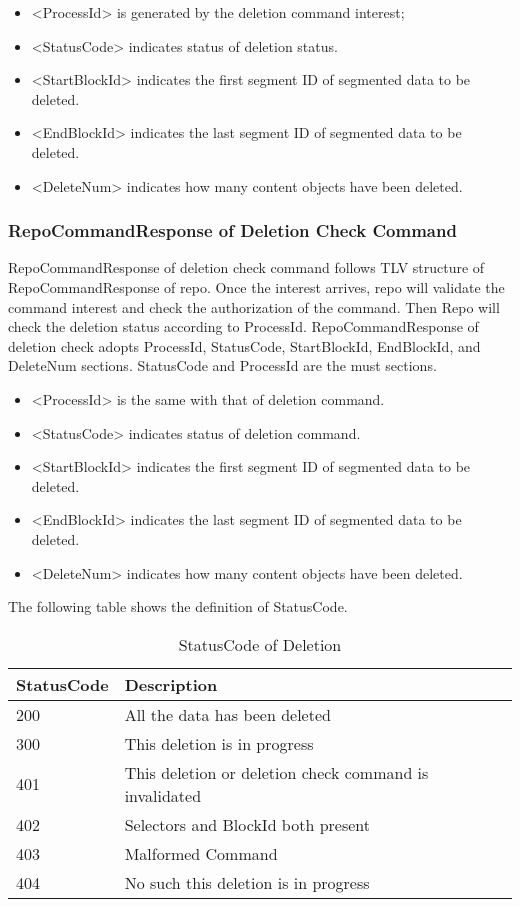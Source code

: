 \documentclass{acm_proc_article-sp}
\begin{document}
\begin{itemize}
\item <ProcessId> is generated by the deletion command interest;
\item <StatusCode> indicates status of deletion status.
\item <StartBlockId> indicates the first segment ID of segmented data to be deleted.
\item <EndBlockId> indicates the last segment ID of segmented data to be deleted.
\item <DeleteNum> indicates how many content objects have been deleted.
\end{itemize}

\subsubsection{RepoCommandResponse of Deletion Check Command}
RepoCommandResponse of deletion check command follows TLV structure of RepoCommandResponse of repo. Once the interest arrives, repo will validate the command interest and check the authorization of the command. Then Repo will check the deletion status according to ProcessId. RepoCommandResponse of deletion check adopts ProcessId, StatusCode, StartBlockId, EndBlockId, and DeleteNum sections. StatusCode and ProcessId are the must sections.

\begin{itemize}
\item <ProcessId> is the same with that of deletion command.
\item <StatusCode> indicates status of deletion command.
\item <StartBlockId> indicates the first segment ID of segmented data to be deleted.
\item <EndBlockId> indicates the last segment ID of segmented data to be deleted.
\item <DeleteNum> indicates how many content objects have been deleted.
\end{itemize}

The following table shows the definition of StatusCode.

\begin{table}[!hbp]
\centering

\begin{tabular}{l l}

\hline
StatusCode & Description \\
\hline
200 & All the data has been deleted \\
300 & This deletion is in progress \\
401 & This deletion or deletion check command is invalidated \\
402 & Selectors and BlockId both present\\
403 & Malformed Command \\
404 & No such this deletion  is in progress \\
\hline

\end{tabular}
\caption{StatusCode of Deletion}
\end{table}
\end{document}
